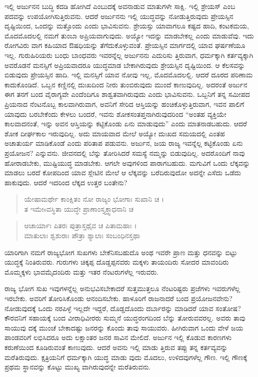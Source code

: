 ಇಲ್ಲಿ ಅರ್ಜುನನ ಬುದ್ಧಿ ಕದಡಿ ಹೋಗಿದೆ ಎಂಬುದಕ್ಕೆ ಅವನಾಡುವ ಮಾತುಗಳೇ ಸಾಕ್ಷಿ. ಇಲ್ಲಿ ಶ್ರೇಯಸ್ ಎಂಬ ಪದವನ್ನು ಉಪಯೋಗಿಸುತ್ತಿರುವನು. ಆದರೆ ಅರ್ಜುನನು ಇಲ್ಲಿ ಯುದ್ಧವನ್ನು ನೋಡುತ್ತಿರುವುದು ಪ್ರೇಯಸ್ಸಿನ ದೃಷ್ಟಿಯಿಂದ, ಒಂದನ್ನು ಮತ್ತೊಂದು ಎಂದು ಭಾವಿಸುವನು. ಶ್ರೇಯಸ್ಸು ಯಾವಾಗಲೂ ಕಷ್ಟದ ಹಾದಿ, ಕಂಟಕಮಯ, ಮೊದಮೊದಲಲ್ಲಿ ನಮಗೆ ತುಂಬಾ ಅಪ್ರಿಯವಾಗುವುದು. ಅಯ್ಯೋ ಇದನ್ನು ಮಾಡಬೇಕಲ್ಲ ಎಂದು ಮಾಡುವೆವು. ಇದು ರೋಗವಿರು ವಾಗ ಕಹಿಯಾದ ಔಷಧಿಯನ್ನು ತೆಗೆದುಕೊಳ್ಳುವಂತೆ. ಪ್ರೇಯಸ್ಸಿನ ಮಾರ್ಗದಲ್ಲಿ ಯಾವ ಘರ್ಷಣೆಯೂ ಇಲ್ಲ. ಗುರುಹಿರಿಯರು ಬಂಧು ಬಾಂಧವರು ಇವರನ್ನೆಲ್ಲ ಅರ್ಜುನನು ಎದುರಿಸು ತ್ತಿರುವಾಗ, ಧರ್ಮಕ್ಕಾಗಿ ಕರ್ತವ್ಯಕ್ಕಾಗಿ ಅವರೊಡನೆ ಮನಸ್ಸಿಗೆ ಅಪ್ರಿಯವಾದರೂ ಯುದ್ಧಮಾಡ ಬೇಕಾಗಿರುವುದು ಶ್ರೇಯಸ್ಸಿನ ದೃಷ್ಟಿಯಿಂದ. ಆ ಕೆಲಸವನ್ನು ಬಿಡುವುದು ಪ್ರೇಯಸ್ಸಿನ ಹಾದಿ. ಇಲ್ಲಿ ಮನಸ್ಸಿಗೆ ಯಾವ ನೋವು ಇಲ್ಲ, ಮೊದಮೊದಲಲ್ಲಿ. ಆದರೆ ದೂರದ ಪರಿಣಾಮ ಕಾದುಕೊಂಡಿದೆ. ಒಬ್ಬನ ಕಣ್ಣಿನಲ್ಲಿ ದುಃಖದಿಂದ ನೀರು ತುಂಬಿರುವುದು ಮುಂದೆ ಕಾಣುವುದಿಲ್ಲ. ಅದರಂತೆ ಅರ್ಜುನ ಈಗ ತನಗೆ ಬಂದ ವೈರಾಗ್ಯವೇ ಎಂದೆಂದಿಗೂ ಶಾಶ್ವತವಾಗಿರುವುದು ಎಂದು ಭಾವಿಸುವನು. ಒಬ್ಬನಿಗೆ ತನ್ನ ಸಮೀಪದ ಪ್ರಿಯನಾದ ನೆಂಟನೊಬ್ಬ ಕಾಲವಾಗಿರುವಾಗ, ಅವನಿಗೆ ಸೇರಿದ ಆಸ್ತಿಯನ್ನು ಹಂಚಿಕೊಳ್ಳುತ್ತಿರುವಾಗ, ಇವನ ಪಾಲಿಗೆ ಯಾವುದು ಬರಬೇಕೆಂದು ಕೇಳಲು ಬಂದರೆ, ಇವನು ಶೋಕಸಂತಪ್ತನಾಗಿರುವುದರಿಂದ “ಅಂತಹ ವ್ಯಕ್ತಿಯೇ ಕಾಲವಾದನಂತೆ, ಇನ್ನು ಅವನ ಆಸ್ತಿಯನ್ನು ಕಟ್ಟಿಕೊಂಡು ಏನು ಮಾಡುವುದು” ಎಂದು ಮಾತನಾಡಬಹುದು. ಆದರೆ ಶೋಕ ದೀರ್ಘಕಾಲ ಇರುವುದಿಲ್ಲ. ಅದು ಮಾಯವಾದ ಮೇಲೆ ಅಯ್ಯೋ ದುಃಖದ ಸಮಯದಲ್ಲಿ ಎಂತಹ ಅಚಾತುರ್ಯ ಮಾಡಿಕೊಂಡೆ ಎಂದು ಪರಿತಾಪ ಪಡುವನು. ಅರ್ಜುನ, ಜಯ ರಾಜ್ಯ ಇವನ್ನೆಲ್ಲ ಕಟ್ಟಿಕೊಂಡು ಏನು ಪ್ರಯೋಜನ? ಎನ್ನುವನು. ಜೀವನದಲ್ಲಿ ಬೆನ್ನು ತೋರಿಸಿದರೆ ಸಮಸ್ಯೆ ನಮ್ಮನ್ನು ಬಿಡುವುದಿಲ್ಲ. ಅದರೊಂದಿಗೆ ನಾವು ಹೋರಾಡಬೇಕು, ಮುಷ್ಟಿಯುದ್ಧ ಮಾಡಬೇಕು. ಆಗಲೇ ಅವುಗಳಿಂದ ಪಾರಾಗಬಹುದು. ಮಗುವಿಗೆ ಒಂದು ಲೆಕ್ಕವನ್ನು ಮಾಡಲು ಬರದೆ ಕೋಪದಿಂದ ಯಾವ ಸ್ಲೇಟಿನ ಮೇಲೆ ಆ ಲೆಕ್ಕವನ್ನು ಬರೆದಿರುವುದೋ ಅದನ್ನೇ ಎಸೆದು ಒಡೆದು ಹಾಕುವುದು. ಆದರೆ ಇದರಿಂದ ಲೆಕ್ಕದ ಉತ್ತರ ಬಂತೇನು?

\begin{verse}
ಯೇಷಾಮರ್ಥೇ ಕಾಂಕ್ಷಿತಂ ನೋ ರಾಜ್ಯಂ ಭೋಗಾಃ ಸುಖಾನಿ ಚ ।\\ತ ಇಮೇsವಸ್ಥಿತಾ ಯುದ್ಧೇ ಪ್ರಾಣಾಂಸ್ತ್ಯಕ್ತ್ವಾಧನಾನಿ ಚ 
\end{verse}

\begin{verse}
ಆಚಾರ್ಯಾಃ ಪಿತರಃ ಪುತ್ರಾಸ್ತಥೈವ ಚ ಪಿತಾಮಹಾಃ ।\\ಮಾತುಲಾಃ ಶ್ವಶುರಾಃ ಪೌತ್ರಾ ಶ್ಯಾಲಾಃ ಸಂಬಂಧಿನಸ್ತಥಾ 
\end{verse}

{\small ಯಾರಿಗಾಗಿ ನಮಗೆ ರಾಜ್ಯಭೋಗ ಸುಖಗಳು ಬೇಕೆನಿಸಬಹುದೊ ಅಂಥ ಇವರೇ ಪ್ರಾಣ ಮತ್ತು ಧನವನ್ನು ಬಿಟ್ಟು ಯುದ್ಧಕ್ಕೆ ನಿಂತಿರುವರು. ಗುರುಗಳು ಚಿಕ್ಕಪ್ಪ ದೊಡ್ಡಪ್ಪನವರು ಮಕ್ಕಳು ತಾಯಂದಿರು ಸೋದರ ಮಾವಂದಿರು ಮೊಮ್ಮಕ್ಕಳು ಭಾವಮೈದಂದಿರು ಮತ್ತು ಇತರ ನೆಂಟರುಗಳೆಲ್ಲ ಇರುವರು.}

ರಾಜ್ಯ ಭೋಗ ಸುಖ ಇವುಗಳನ್ನೆಲ್ಲ ಅನುಭವಿಸಬೇಕಾದರೆ ಸುತ್ತಮುತ್ತಲೂ ನೆಂಟರಿಷ್ಟರು ಪ್ರಜೆಗಳು ಇವರುಗಳೆಲ್ಲ ಇರಬೇಕು. ಅವರಿಗೆ ತೋರಿಸಿಕೊಂಡು ಆನಂದಿಸಬೇಕು. ಹಾಳೂರಿಗೆ ರಾಜನಾದರೆ ಬಂದ ಪ್ರಯೋಜನವೇನು? ನೋಡುವುದಕ್ಕೆ ಒಂದು ನರಪಿಳ್ಳೆ ಇಲ್ಲದೇ ಇದ್ದರೆ, ದೊಡ್ಡದೊಂದು ದರ್ಬಾರನ್ನು ಮಾಡಿದರೆ ಯಾವ ಸಂತೋಷ? ಕೌರವನಿಗೆ ಸಹಾಯಕ್ಕೆ ಬಂದ ವೀರಾಧಿವೀರರು ಸುಮ್ಮನೆ ಯುದ್ಧರಂಗದಿಂದ ಬೆನ್ನು ತೋರುವವರಲ್ಲ. ಅವರು ತಾವು ಸಾಯುವು ದಕ್ಕೆ ಮುಂಚೆ ಬೇಕಾದಷ್ಟು ಜನರನ್ನು ಕೊಂದು ತಾವು ಸಾಯುವರು. ಹೀಗಿರುವಾಗ ಒಂದು ವೇಳೆ ಜಯ ಪಾಂಡವರಿಗೆ ಲಭಿಸಿದರೂ ಅದು ಲಕ್ಷಾಂತರ ಜನರ ಸಾವಿನ ಮೇಲಿದೆ. ಅರ್ಜುನ ಇಲ್ಲಿ ಕೊಡುವ ಕಾರಣಗಳು ಕರುಣೆಯಿಂದ ಕೂಡಿರುವಂತೆ ಕಾಣುವುದು. ಆದರೆ ಅವನು ಇಲ್ಲಿ ಮಾಡು ತ್ತಿರುವ ತಪ್ಪು ತನ್ನ ಕರ್ತವ್ಯವನ್ನು ಮರೆತಿರುವುದು. ಕ್ಷತ್ರಿಯನಿಗೆ ಧರ್ಮಕ್ಕಾಗಿ ಯುದ್ಧ ಮಾಡು ವುದು ಮೊದಲು, ಉಳಿದವುಗಳೆಲ್ಲ ಗೌಣ. ಇಲ್ಲಿ ಗೌಣಕ್ಕೆ ಪ್ರಥಮ ಸ್ಥಾನವನ್ನು ಕೊಟ್ಟು ಮುಖ್ಯ ವಾಗಿರುವುದನ್ನೇ ಮರೆತಿರುವನು.

